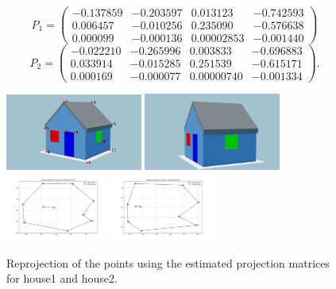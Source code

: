 \[
P_1 = \begin{pmatrix}
-0.137859 & -0.203597 & 0.013123 & -0.742593 \\
 0.006457 & -0.010256 & 0.235090 & -0.576638 \\
 0.000099 & -0.000136 & 0.00002853 & -0.001440
\end{pmatrix}
\]
\[
P_2 = \begin{pmatrix}
-0.022210 & -0.265996 & 0.003833 & -0.696883 \\
 0.033914 & -0.015285 & 0.251539 & -0.615171 \\
 0.000169 & -0.000077 & 0.00000740 & -0.001334
\end{pmatrix}.
\]


\begin{figure}[H]
  \centering
  \includegraphics[width=0.4\textwidth]{../Assets/0.png}
  \includegraphics[width=0.4\textwidth]{../Assets/house2.png}
  \includegraphics[width=0.3\textwidth]{../Assets/img1.png}
  \hspace{1.3cm}
  \includegraphics[width=0.3\textwidth]{../Assets/img2.png}
  \caption{Reprojection of the points using the estimated projection matrices for house1 and house2.}
  \label{fig:reproj}
\end{figure}


